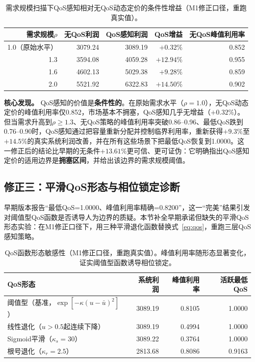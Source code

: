 \documentclass[UTF8,11pt]{ctexart}
\begin{document}
\begin{table}[H]
\centering
\caption{需求规模扫描下QoS感知相对无QoS动态定价的条件性增益（M1修正口径，重跑真实值）。}
\label{tab:demand_scale}
\small
\begin{tabular}{rrrrr}
\toprule
需求规模$\rho$ & 无QoS利润 & QoS感知利润 & QoS增益 & 无QoS峰值利用率 \\
\midrule
1.0（原始水平） & 3079.24 & 3089.19 & $+0.32\%$ & 0.852 \\
1.3 & 3594.08 & 4059.28 & $+12.94\%$ & 0.955 \\
1.6 & 4602.13 & 5029.38 & $+9.28\%$ & 0.859 \\
2.0 & 5521.92 & 6322.83 & $+14.50\%$ & 0.902 \\
\bottomrule
\end{tabular}
\end{table}

\textbf{核心发现。} QoS感知的价值是\textbf{条件性的}。在原始需求水平（$\rho=1.0$），无QoS动态定价的峰值利用率仅0.852，市场基本不拥塞，QoS感知几乎无增益（$+0.32\%$）。但当需求升高到$\rho\ge1.3$、无QoS策略的峰值利用率突破0.86--0.96、最低QoS跌到0.76--0.90时，QoS感知通过把容量重新分配并控制临界利用率，重新获得$+9.3\%$至$+14.5\%$的真实系统利润改善，并在所有这些场景下把最低QoS恢复到1.0000。这一修正后的结论比早期的无条件$+13.61\%$更可信、更可证伪：它明确指出QoS感知定价的适用边界是\textbf{拥塞区间}，并给出该边界的需求规模阈值。

\subsection{修正三：平滑QoS形态与相位锁定诊断}
\label{sec:smooth_qos}

早期版本报告“最低QoS=1.0000、峰值利用率精确=0.8200”，这一“完美”结果引发对阈值型QoS函数是否诱导人为边界的质疑。本节补全早期承诺但缺失的平滑QoS形态实验：在M1修正口径下，用三种平滑退化函数替换式~\eqref{eq:qos}，重跑三层QoS感知策略。

\begin{table}[H]
\centering
\caption{QoS函数形态敏感性（M1修正口径，重跑真实值）。峰值利用率随形态显著变化，证实阈值型函数诱导相位锁定。}
\label{tab:smooth_qos}
\small
\begin{tabular}{lrrr}
\toprule
QoS形态 & 系统利润 & 峰值利用率 & 活跃最低QoS \\
\midrule
阈值型（基准，$\exp[-\kappa(u-\bar u)^2]$） & 3089.19 & 0.8105 & 1.0000 \\
线性退化（$u>0.5$起连续下降） & 3089.19 & 0.4994 & 1.0000 \\
Sigmoid平滑（$\kappa_s=30$） & 3089.22 & 0.3764 & 1.0000 \\
根号退化（$\kappa_r=2.5$） & 2813.68 & 0.8086 & 0.9163 \\
\bottomrule
\end{tabular}
\end{table}
\end{document}
